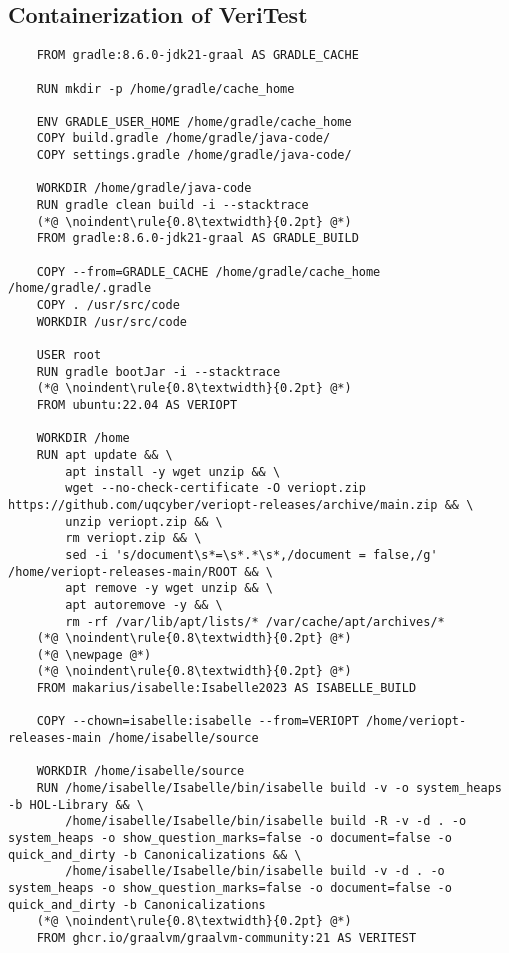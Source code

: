 \begin{appendices}
\cleardoublepage


\chapter{Containerization of VeriTest}
\label{app:Containerization}

\begin{lstlisting}
    FROM gradle:8.6.0-jdk21-graal AS GRADLE_CACHE

    RUN mkdir -p /home/gradle/cache_home

    ENV GRADLE_USER_HOME /home/gradle/cache_home
    COPY build.gradle /home/gradle/java-code/
    COPY settings.gradle /home/gradle/java-code/

    WORKDIR /home/gradle/java-code
    RUN gradle clean build -i --stacktrace
    (*@ \noindent\rule{0.8\textwidth}{0.2pt} @*)
    FROM gradle:8.6.0-jdk21-graal AS GRADLE_BUILD

    COPY --from=GRADLE_CACHE /home/gradle/cache_home /home/gradle/.gradle
    COPY . /usr/src/code
    WORKDIR /usr/src/code

    USER root
    RUN gradle bootJar -i --stacktrace
    (*@ \noindent\rule{0.8\textwidth}{0.2pt} @*)
    FROM ubuntu:22.04 AS VERIOPT

    WORKDIR /home
    RUN apt update && \
        apt install -y wget unzip && \
        wget --no-check-certificate -O veriopt.zip https://github.com/uqcyber/veriopt-releases/archive/main.zip && \
        unzip veriopt.zip && \
        rm veriopt.zip && \
        sed -i 's/document\s*=\s*.*\s*,/document = false,/g' /home/veriopt-releases-main/ROOT && \
        apt remove -y wget unzip && \
        apt autoremove -y && \
        rm -rf /var/lib/apt/lists/* /var/cache/apt/archives/*
    (*@ \noindent\rule{0.8\textwidth}{0.2pt} @*)
    (*@ \newpage @*)
    (*@ \noindent\rule{0.8\textwidth}{0.2pt} @*)
    FROM makarius/isabelle:Isabelle2023 AS ISABELLE_BUILD

    COPY --chown=isabelle:isabelle --from=VERIOPT /home/veriopt-releases-main /home/isabelle/source

    WORKDIR /home/isabelle/source
    RUN /home/isabelle/Isabelle/bin/isabelle build -v -o system_heaps -b HOL-Library && \
        /home/isabelle/Isabelle/bin/isabelle build -R -v -d . -o system_heaps -o show_question_marks=false -o document=false -o quick_and_dirty -b Canonicalizations && \
        /home/isabelle/Isabelle/bin/isabelle build -v -d . -o system_heaps -o show_question_marks=false -o document=false -o quick_and_dirty -b Canonicalizations
    (*@ \noindent\rule{0.8\textwidth}{0.2pt} @*)
    FROM ghcr.io/graalvm/graalvm-community:21 AS VERITEST


\end{lstlisting}
\end{appendices}
